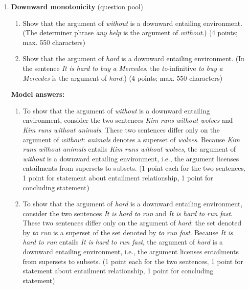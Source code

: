 \documentclass[a4,11pt]{article}
\begin{document}
\begin{enumerate}[leftmargin = 12pt]
\item {\bf Downward monotonicity} (question pool)

\begin{enumerate}[noitemsep]

\item Show that the argument of \textit{without} is a downward entailing environment. (The determiner phrase \textit{any help} is the argument of \textit{without}.) (4 points; max. 550 characters)

\item Show that the argument of \textit{hard} is a downward entailing environment. (In the sentence \textit{It is hard to buy a Mercedes}, the \textit{to}-infinitive \textit{to buy a Mercedes} is the argument of \textit{hard}.) (4 points; max. 550 characters)

\end{enumerate}

{\bf Model answers:} 

\begin{enumerate}[noitemsep]

\item To show that the argument of \textit{without} is a downward entailing environment, consider the two sentences \textit{Kim runs without wolves} and \textit{Kim runs without animals}. These two sentences differ only on the argument of {\em without}: {\em animals} denotes a superset of {\em wolves}. Because \textit{Kim runs without animals} entails \textit{Kim runs without wolves}, the argument of \textit{without} is a downward entailing environment, i.e., the argument licenses entailments from supersets to subsets.  (1 point each for the two sentences, 1 point for statement about entailment relationship, 1 point for concluding statement)

\item To show that the argument of \textit{hard} is a downward entailing environment, consider the two sentences {\em It is hard to run} and {\em It is hard to run fast}. These two sentences differ only on the argument of {\em hard}: the set denoted by {\em to run} is a superset of the set denoted by {\em to run fast}. Because {\em It is hard to run} entails {\em It is hard to run fast}, the argument of {\em hard} is a downward entailing environment, i.e., the argument licenses entailments from supersets to subsets. (1 point each for the two sentences, 1 point for statement about entailment relationship, 1 point for concluding statement)

\end{enumerate}


\end{enumerate}
\end{document}
